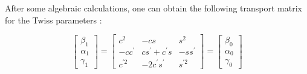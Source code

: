 After some algebraic calculations, one can obtain the following transport matrix for the Twiss parameters \parencite*[][]{ref:MatrixToTwiss}:

\begin{equation}
    \begin{bmatrix}
       \beta_1 \\ \alpha_1 \\ \gamma_1
    \end{bmatrix}
    =
\begin{bmatrix}
   c^2 & - c s & s^2 \\ -c c^{'} & cs^{'} + c^{'}s & -s s^{'} \\ c^{'2} & -2c^{'}s^{'} & s^{'2}
\end{bmatrix}
=
\begin{bmatrix}
   \beta_0 \\ \alpha_0 \\ \gamma_0
\end{bmatrix}
\label{eq:MatrixEq}
\end{equation}


